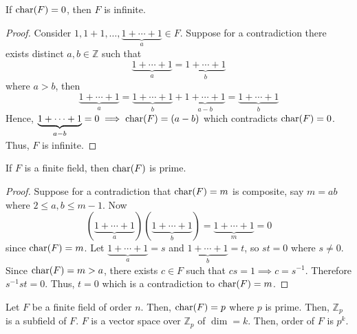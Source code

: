 \begin{thmbox}
    \begin{theorem}
    If $ \operatorname{char}(F)=0 $, then $ F $ is infinite.
\end{theorem} \end{thmbox}

\begin{proof}
    Consider $ 1,1+1,\ldots,\underbrace{1+\cdots+1}_{a}\in F $. 
    Suppose for a contradiction there exists distinct $ a,b\in\mathbb{Z} $
    such that
    \[ \underbrace{1+\cdots+1}_{a}=\underbrace{1+\cdots+1}_{b} \]
    where $ a>b $, then
    \[ \underbrace{1+\cdots+1}_{a}=\underbrace{1+\cdots+1}_{b}+
    \underbrace{1+\cdots+1}_{a-b}=\underbrace{1+\cdots+1}_{b} \]
    Hence, $ \underbrace{1+\cdots+1}_{a-b}=0\implies \operatorname{char}(F)=(a-b) $
    which contradicts $ \operatorname{char}(F)=0 $. Thus, $ F $ is infinite.
\end{proof}

\begin{thmbox}
    \begin{theorem}
    If $ F $ is a finite field, then $ \operatorname{char}(F) $ is prime.
\end{theorem} \end{thmbox}

\begin{proof}
    Suppose for a contradiction that $ \operatorname{char}(F)=m $ is composite,
    say $ m=ab $ where
    $ 2\leqslant a,b\leqslant m-1 $. Now
    \[ (\underbrace{1+\cdots+1}_{a})(\underbrace{1+\cdots+1}_{b})
    =\underbrace{1+\cdots+1}_{m}=0 \]
    since $ \operatorname{char}(F)=m $. Let $ \underbrace{1+\cdots+1}_{a}=s $
    and $ \underbrace{1+\cdots+1}_{b}=t $, so $ st=0 $ where $ s\neq 0 $. 
    Since $ \operatorname{char}(F)=m>a $, there exists $ c\in F $ such that
    $ cs=1 \implies c=s^{-1} $. Therefore $ s^{-1}st=0 $. Thus,
    $ t=0 $ which is a contradiction to $ \operatorname{char}(F)=m $.
\end{proof}

 Let $ F $ be a finite field of order $ n $.
Then, $ \operatorname{char}(F)=p $ where $ p $ is prime. Then, $ \mathbb{Z}_p $ is a subfield
of $ F $. $ F $ is a vector space over $ \mathbb{Z}_p $ of $ \dim=k $.
Then, order of $ F $ is $ p^k $.
